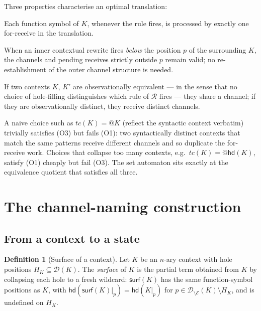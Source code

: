 \documentclass[11pt]{article}
\theoremstyle{plain}
\theoremstyle{definition}
\newtheorem{definition}[theorem]{Definition}
\theoremstyle{remark}
\newcommand{\hd}{\mathsf{hd}}
\newcommand{\dom}{\mathcal{D}}
\newcommand{\edges}{\mathcal{E}}
\newcommand{\surface}{\mathsf{surf}}
\begin{document}
Three properties characterise an optimal translation:

\begin{description}[leftmargin=*]
  \item[(O1) Symbol-once.] Each function symbol of $K$, whenever the rule fires,
        is processed by exactly one \textsf{for}-receive in the translation.
  \item[(O2) Prune-preserves.] When an inner contextual rewrite fires
        \emph{below} the position $p$ of the surrounding $K$, the channels
        and pending receives strictly outside $p$ remain valid; no
        re-establishment of the outer channel structure is needed.
  \item[(O3) Coarsest sound.] If two contexts $K$, $K'$ are
        observationally equivalent --- in the sense that no choice of
        hole-filling distinguishes which rule of $\mathcal{R}$ fires --- they
        share a channel; if they are observationally distinct, they receive
        distinct channels.
\end{description}

A naive choice such as $tc(K) = @K$ (reflect the syntactic context
verbatim) trivially satisfies (O3) but fails (O1): two syntactically distinct
contexts that match the same patterns receive different channels and so
duplicate the for-receive work. Choices that collapse too many contexts,
e.g.\ $tc(K) = @\hd(K)$, satisfy (O1) cheaply but fail (O3). The set
automaton sits exactly at the equivalence quotient that satisfies all
three.

\section{The channel-naming construction}\label{sec:construction}

\subsection{From a context to a state}

\begin{definition}[Surface of a context]\label{def:surface}
Let $K$ be an $n$-ary context with hole positions $H_{K} \subseteq \dom(K)$.
The \emph{surface} of $K$ is the partial term obtained from $K$ by
collapsing each hole to a fresh wildcard: $\surface(K)$ has the same
function-symbol positions as $K$, with $\hd(\surface(K)|_{p}) = \hd(K|_{p})$
for $p \in \dom_{\setminus\edges}(K) \setminus H_{K}$, and is undefined on
$H_{K}$.
\end{definition}
\end{document}
